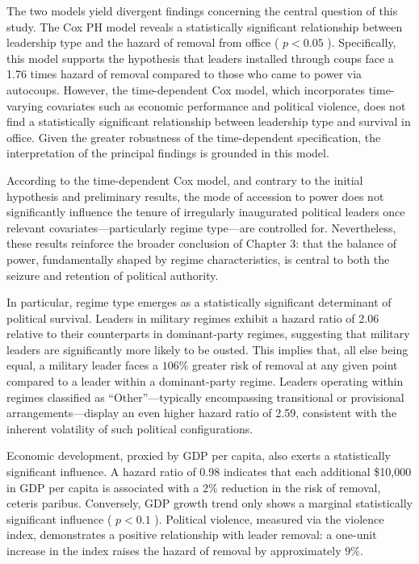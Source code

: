 \documentclass[
  12pt,
]{report}
\begin{document}
The two models yield divergent findings concerning the central question
of this study. The Cox PH model reveals a statistically significant
relationship between leadership type and the hazard of removal from
office ( \(p < 0.05\) ). Specifically, this model supports the
hypothesis that leaders installed through coups face a 1.76 times hazard
of removal compared to those who came to power via autocoups. However,
the time-dependent Cox model, which incorporates time-varying covariates
such as economic performance and political violence, does not find a
statistically significant relationship between leadership type and
survival in office. Given the greater robustness of the time-dependent
specification, the interpretation of the principal findings is grounded
in this model.

According to the time-dependent Cox model, and contrary to the initial
hypothesis and preliminary results, the mode of accession to power does
not significantly influence the tenure of irregularly inaugurated
political leaders once relevant covariates---particularly regime
type---are controlled for. Nevertheless, these results reinforce the
broader conclusion of Chapter 3: that the balance of power,
fundamentally shaped by regime characteristics, is central to both the
seizure and retention of political authority.

In particular, regime type emerges as a statistically significant
determinant of political survival. Leaders in military regimes exhibit a
hazard ratio of 2.06 relative to their counterparts in dominant-party
regimes, suggesting that military leaders are significantly more likely
to be ousted. This implies that, all else being equal, a military leader
faces a \(106\%\) greater risk of removal at any given point compared to
a leader within a dominant-party regime. Leaders operating within
regimes classified as ``Other''---typically encompassing transitional or
provisional arrangements---display an even higher hazard ratio of 2.59,
consistent with the inherent volatility of such political
configurations.

Economic development, proxied by GDP per capita, also exerts a
statistically significant influence. A hazard ratio of 0.98 indicates
that each additional \$10,000 in GDP per capita is associated with a
\(2\%\) reduction in the risk of removal, ceteris paribus. Conversely,
GDP growth trend only shows a marginal statistically significant
influence ( \(p<0.1\) ). Political violence, measured via the violence
index, demonstrates a positive relationship with leader removal: a
one-unit increase in the index raises the hazard of removal by
approximately \(9\%\).
\end{document}
